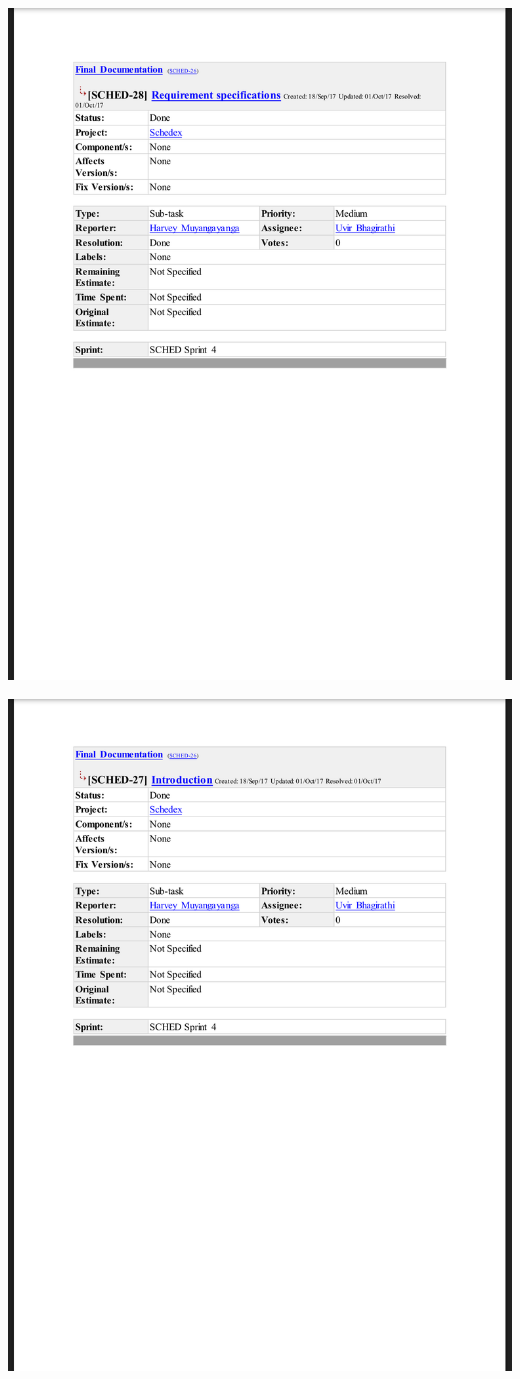 \documentclass{article}
\begin{document}
\centerline{\includegraphics[scale=0.4]{sprint4_4}}

\centerline{\includegraphics[scale=0.4]{sprint4_5}}
\end{document}
